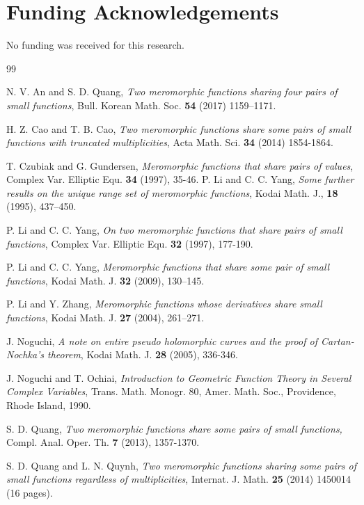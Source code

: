 \documentclass[12pt,leqno]{amsart}
\numberwithin{equation}{section}
\begin{document}
\section*{Funding Acknowledgements}
No funding was received for this research.
\begin{thebibliography}{99}

 N. V. An and S. D. Quang, \textit{Two meromorphic functions sharing four pairs of small functions}, Bull. Korean Math. Soc. \textbf{54} (2017) 1159--1171.

 H. Z. Cao and T. B. Cao, \textit{Two meromorphic functions share some pairs of small functions with truncated multiplicities}, Acta Math. Sci. \textbf{34} (2014) 1854-1864.

 T. Czubiak and G. Gundersen, \textit{Meromorphic functions that share pairs of values}, Complex Var. Elliptic Equ. \textbf{34} (1997), 35-46.
 P. Li and C. C. Yang, \textit{Some further results on the unique range set of meromorphic functions}, Kodai Math. J., \textbf{18} (1995), 437--450.

 P. Li and C. C. Yang, \textit{On two meromorphic functions that share pairs of small functions}, Complex Var. Elliptic Equ. \textbf{32} (1997), 177-190.

 P. Li and C. C. Yang, \textit{Meromorphic functions that share some pair of small functions}, Kodai Math. J. \textbf{32} (2009), 130--145.

 P. Li and Y. Zhang, \textit{Meromorphic functions whose derivatives share small functions}, Kodai Math. J. \textbf{27} (2004), 261--271.

 J. Noguchi, \textit{A note on entire pseudo holomorphic curves and the proof of Cartan-Nochka's theorem}, Kodai Math. J. \textbf{28} (2005), 336-346.

 J. Noguchi and T. Ochiai, \textit{Introduction to Geometric Function Theory in Several Complex Variables}, Trans. Math. Monogr. 80, Amer. Math. Soc., Providence, Rhode Island, 1990.

 S. D. Quang, \textit{Two meromorphic functions share some pairs of small functions,} Compl. Anal. Oper. Th. \textbf{7} (2013), 1357-1370.

 S. D. Quang and L. N. Quynh, \textit{Two meromorphic functions sharing some pairs of small functions regardless of multiplicities}, Internat. J. Math. \textbf{25} (2014) 1450014 (16 pages).


\end{thebibliography}
\end{document}

